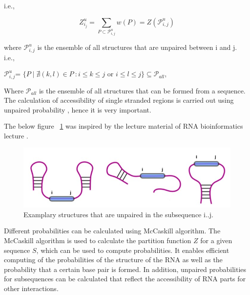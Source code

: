 \documentclass[twoside,a4paper]{report}
\begin{document}
 	 i.e., 
 	 \begin{center}	 
 	 	\[ 
 	 	Z^u_{i_j}= \sum_{P \subset \mathcal{P}_{i,j}^{u}} w(P) = Z(\mathcal{P}_{i,j}^{u})
 	 	\]
 	 \end{center}
  
  	 where $\mathcal{P}_{i,j}^{u}$ is the ensemble of all structures that are unpaired between i and j.\\
  	 
  	  i.e., 
  	 \begin{center}	 
  	 
  	 	$\mathcal{P}^u_{i,j}$= $\{P \mid \nexists (k,l) \in P\ : i \leq k \leq j $ or $ i \leq l \leq j\}\subseteq \mathcal {P}_{all}$,
  	 
  	 \end{center}
  	 
  	 Where $\mathcal {P}_{all}$ is the ensemble of all structures that can be formed from a sequence. The calculation of accessibility of single stranded regions is carried out using  unpaired probability \citep{muckstein2006thermodynamics}, hence it is very important. 
  
 	 The below figure ~\ref{fig:unpaired} was inspired by the lecture material of RNA bioinformatics lecture .\\
 	 
 	 \begin{figure}[tb]
 	 	\includegraphics[width=0.8\linewidth]{unpaired}
 	 	\centering
 	 	\caption{Examplary structures that are unpaired in the subsequence i..j.}
 	 	\label{fig:unpaired}
 	 \end{figure}
  
 	 Different probabilities can be calculated using McCaskill algorithm. The McCaskill algorithm \citep{mccaskill1990equilibrium} is used to calculate the partition function $Z$ for a given sequence $S$, which can be used to compute probabilities. It enables efficient computing of the probabilities of the structure of the RNA as well as the probability that a certain base pair is formed. In addition, unpaired probabilities for subsequences can be calculated that reflect the accessibility of RNA parts for other interactions.\\ 
 	
\end{document}
